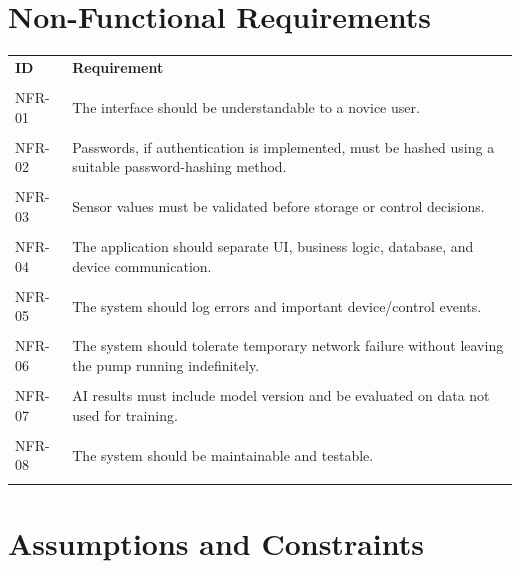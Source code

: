 \documentclass[12pt,a4paper]{report}
\begin{document}
\section{Non-Functional Requirements}

\begin{longtable}{p{}p{}}

\toprule

\textbf{ID} & \textbf{Requirement}\\\\

\midrule

NFR-01 & The interface should be understandable to a novice user.\\\\

NFR-02 & Passwords, if authentication is implemented, must be hashed using a suitable password-hashing method.\\\\

NFR-03 & Sensor values must be validated before storage or control decisions.\\\\

NFR-04 & The application should separate UI, business logic, database, and device communication.\\\\

NFR-05 & The system should log errors and important device/control events.\\\\

NFR-06 & The system should tolerate temporary network failure without leaving the pump running indefinitely.\\\\

NFR-07 & AI results must include model version and be evaluated on data not used for training.\\\\

NFR-08 & The system should be maintainable and testable.\\\\

\bottomrule

\end{longtable}

\section{Assumptions and Constraints}
\end{document}

